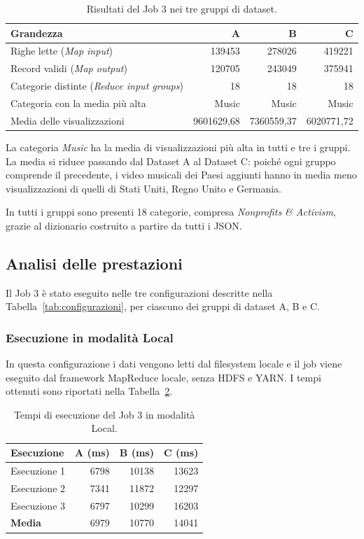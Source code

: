 \documentclass[12pt, a4paper]{article}
\begin{document}
\begin{table}[H]
\centering
\small
\begin{tabular}{|l|r|r|r|}
\hline
\textbf{Grandezza} &
\textbf{A} &
\textbf{B} &
\textbf{C} \\
\hline
Righe lette (\textit{Map input}) & 139453 & 278026 & 419221 \\
Record validi (\textit{Map output}) & 120705 & 243049 & 375941 \\
Categorie distinte (\textit{Reduce input groups}) & 18 & 18 & 18 \\
\hline
Categoria con la media più alta & Music & Music & Music \\
Media delle visualizzazioni & 9601629,68 & 7360559,37 & 6020771,72 \\
\hline
\end{tabular}
\caption{Risultati del Job 3 nei tre gruppi di dataset.}
\label{tab:job3risultati}
\end{table}

La categoria \textit{Music} ha la media di visualizzazioni
più alta in tutti e tre i gruppi.
La media si riduce passando dal Dataset A al Dataset C:
poiché ogni gruppo comprende il precedente, i video musicali
dei Paesi aggiunti hanno in media meno visualizzazioni
di quelli di Stati Uniti, Regno Unito e Germania.

In tutti i gruppi sono presenti 18 categorie, compresa
\textit{Nonprofits \& Activism}, grazie al dizionario
costruito a partire da tutti i JSON.


\subsection{Analisi delle prestazioni}

Il Job 3 è stato eseguito nelle tre configurazioni
descritte nella Tabella~\ref{tab:configurazioni},
per ciascuno dei gruppi di dataset A, B e C.

\subsubsection{Esecuzione in modalità Local}

In questa configurazione i dati vengono letti
dal filesystem locale e il job viene eseguito
dal framework MapReduce locale, senza HDFS e YARN.
I tempi ottenuti sono riportati nella
Tabella~\ref{tab:job3local}.

\begin{table}[H]
\centering
\small
\begin{tabular}{|l|r|r|r|}
\hline
\textbf{Esecuzione} &
\textbf{A (ms)} &
\textbf{B (ms)} &
\textbf{C (ms)} \\
\hline
Esecuzione 1 & 6798 & 10138 & 13623 \\
Esecuzione 2 & 7341 & 11872 & 12297 \\
Esecuzione 3 & 6797 & 10299 & 16203 \\
\hline
\textbf{Media} & 6979 & 10770 & 14041 \\
\hline
\end{tabular}
\caption{Tempi di esecuzione del Job 3 in modalità Local.}
\label{tab:job3local}
\end{table}
\end{document}
